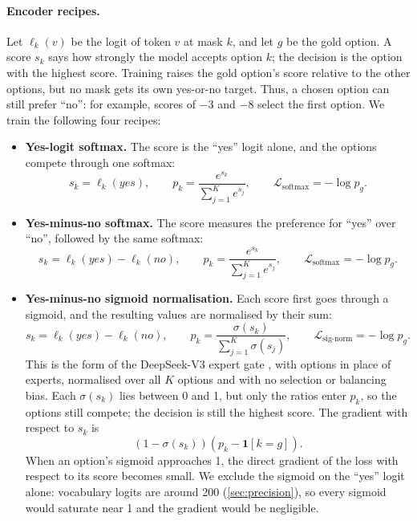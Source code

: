 \paragraph{Encoder recipes.}
Let $\ell_k(v)$ be the logit of token $v$ at mask $k$, and let $g$ be the gold option.
A score $s_k$ says how strongly the model accepts option $k$; the decision is the option with the highest score.
Training raises the gold option's score relative to the other options, but no mask gets its own yes-or-no target.
Thus, a chosen option can still prefer ``no'': for example, scores of $-3$ and $-8$ select the first option.
We train the following four recipes:
\begin{itemize}
  \item \textbf{Yes-logit softmax.}
    The score is the ``yes'' logit alone, and the options compete through one softmax:
    \begin{equation}
      s_k=\ell_k(\textit{yes}),\qquad
      p_k=\frac{e^{s_k}}{\sum_{j=1}^{K}e^{s_j}},\qquad
      \mathcal{L}_{\text{softmax}}=-\log p_g.
    \end{equation}

  \item \textbf{Yes-minus-no softmax.}
    The score measures the preference for ``yes'' over ``no'', followed by the same softmax:
    \begin{equation}
      s_k=\ell_k(\textit{yes})-\ell_k(\textit{no}),\qquad
      p_k=\frac{e^{s_k}}{\sum_{j=1}^{K}e^{s_j}},\qquad
      \mathcal{L}_{\text{softmax}}=-\log p_g.
    \end{equation}

  \item \textbf{Yes-minus-no sigmoid normalisation.}
    Each score first goes through a sigmoid, and the resulting values are normalised by their sum:
    \begin{equation}
      s_k=\ell_k(\textit{yes})-\ell_k(\textit{no}),\qquad
      p_k=\frac{\sigma(s_k)}{\sum_{j=1}^{K}\sigma(s_j)},\qquad
      \mathcal{L}_{\text{sig-norm}}=-\log p_g.
    \end{equation}
    This is the form of the DeepSeek-V3 expert gate \citep{deepseekv3}, with options in place of experts, normalised over all $K$ options and with no selection or balancing bias.
    Each $\sigma(s_k)$ lies between 0 and 1, but only the ratios enter $p_k$, so the options still compete; the decision is still the highest score.
    The gradient with respect to $s_k$ is
    \begin{equation}
      \left(1-\sigma(s_k)\right)
      \left(p_k-\mathbf{1}[k=g]\right).
    \end{equation}
    When an option's sigmoid approaches 1, the direct gradient of the loss with respect to its score becomes small.
    We exclude the sigmoid on the ``yes'' logit alone: vocabulary logits are around 200 (\cref{sec:precision}), so every sigmoid would saturate near 1 and the gradient would be negligible.


\end{itemize}
